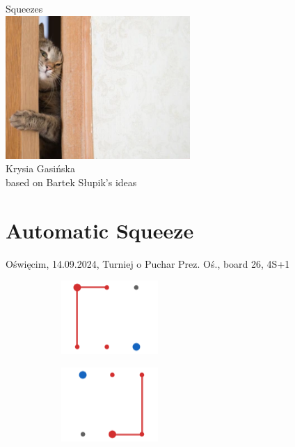 \documentclass[14pt, a4paper]{extreport}
\begin{document}

\begin{titlepage}
    \centering
    \vspace*{2cm}
    {\huge Squeezes\\}
    \vspace{1cm}
    \includegraphics[width=7cm]{./squeezes/cat.png}\\
    \vspace{1cm}
    {\large Krysia Gasińska
    \small{\\
    based on Bartek Słupik's ideas
    }
    }
\end{titlepage}

\section*{Automatic Squeeze}

Oświęcim, 14.09.2024, Turniej o Puchar Prez. Oś., board 26, 4\spades{}S+1
\vspace{0.7cm}

\begin{figure}[H]
    \centering
    \begin{subfigure}{0.4\textwidth}
        \centering
        \includegraphics[scale=0.7]{./squeezes/automatic.png}
    \end{subfigure}
    \begin{subfigure}{0.4\textwidth}
        \centering
        \includegraphics[scale=0.7]{./squeezes/automatic_reverted.png}
    \end{subfigure}
\end{figure}
\end{document}
